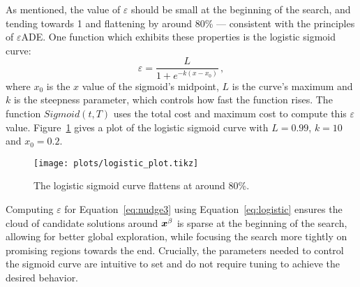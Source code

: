 As mentioned, the value of $\varepsilon$ should be small at the beginning of the search, and tending towards 1 and flattening by around 80\% --- consistent with the principles of $\varepsilon$ADE. One function which exhibits these properties is the logistic sigmoid curve:
\begin{equation}\label{eq:logistic}
\varepsilon = \dfrac{L}{1+e^{-k(x-x_0)}}\,,
\end{equation}
where $x_0$ is the $x$ value of the sigmoid's midpoint, $L$ is the curve's maximum and $k$ is the steepness parameter, which controls how fast the function rises. The function $Sigmoid(t,T)$ uses the total cost and maximum cost to compute this $\varepsilon$ value. Figure~\ref{fig:logistic} gives a plot of the logistic sigmoid curve with $L=0.99$, $k=10$ and $x_0 = 0.2$. 
\begin{figure}[h!]
  \centering
  \texttt{[image: plots/logistic\_plot.tikz]}  
  \caption{The logistic sigmoid curve flattens at around 80\%.} 
    \label{fig:logistic}
\end{figure}
Computing $\varepsilon$ for Equation~\ref{eq:nudge3} using Equation~\ref{eq:logistic} ensures the cloud of candidate solutions around $\boldsymbol{x}^\beta$ is sparse at the beginning of the search, allowing for better global exploration, while focusing the search more tightly on promising regions towards the end. Crucially, the parameters needed to control the sigmoid curve are intuitive to set and do not require tuning to achieve the desired behavior.

